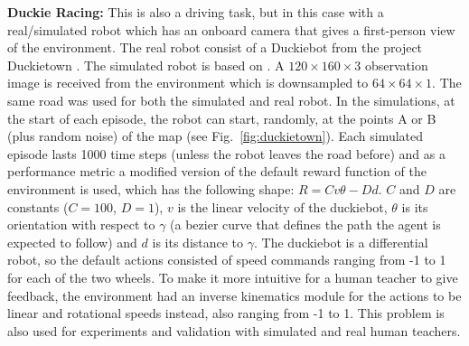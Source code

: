 \textbf{Duckie Racing:} This is also a driving task, but in this case with a real/simulated robot which has an onboard camera that gives a first-person view of the environment. The real robot consist of a Duckiebot from the project Duckietown \cite{Paull2017}. The simulated robot is based on \cite{gym_duckietown}. A $120\times160\times3$ observation image is received from the environment which is downsampled to $64\times64\times1$. The same road was used for both the simulated and real robot. In the simulations, at the start of each episode, the robot can start, randomly, at the points A or B (plus random noise) of the map (see Fig.~\ref{fig:duckietown}). Each simulated episode lasts 1000 time steps (unless the robot leaves the road before) and as a performance metric a modified version of the default reward function of the environment is used, which has the following shape: $R = Cv\theta - Dd$. $C$ and $D$ are constants ($C=100$, $D=1$), $v$ is the linear velocity of the duckiebot, $\theta$ is its orientation with respect to $\gamma$ (a bezier curve that defines the path the agent is expected to follow) and $d$ is its distance to $\gamma$. The duckiebot is a differential robot, so the default actions consisted of speed commands ranging from -1 to 1 for each of the two wheels. To make it more intuitive for a human teacher to give feedback, the environment had an inverse kinematics module for the actions to be linear and rotational speeds instead, also ranging from -1 to 1. This problem is also used for experiments and validation with simulated and real human teachers.


